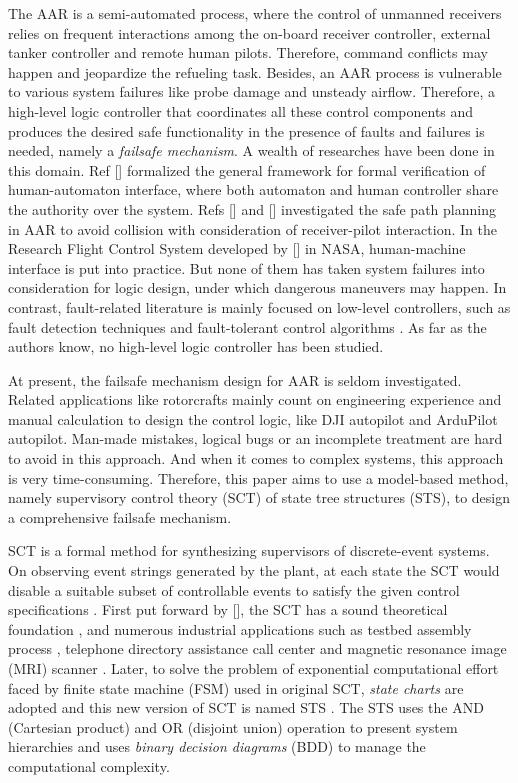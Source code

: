 The AAR is a semi-automated process, where the control of unmanned receivers relies on frequent interactions among the on-board receiver controller, external tanker controller and remote human pilots. Therefore, command conflicts may happen and jeopardize the refueling task.  Besides, an AAR process is vulnerable to various system failures like probe damage and unsteady airflow. Therefore, a high-level logic controller that coordinates all these control components and produces the desired safe functionality in the presence of faults and failures is needed, namely a \textit{failsafe mechanism}. A wealth of researches have been done in this domain. Ref [] formalized the general framework for formal verification of human-automaton interface, where both automaton and human controller share the authority over the system. Refs [] and [] investigated the safe path planning in AAR to avoid collision with consideration of receiver-pilot interaction. In the Research Flight Control System developed by  [] in NASA, human-machine interface is put into practice. But none of them has taken system failures into consideration for logic design, under which dangerous maneuvers may happen. In contrast, fault-related literature is  mainly focused on low-level controllers, such as fault detection techniques \cite{meskin2010hybrid} and fault-tolerant control algorithms \cite{zhang2006issues, falconi2016adaptive}. As far as the authors know, no high-level logic controller has been studied.

At present, the failsafe mechanism design for AAR is seldom investigated. Related applications like rotorcrafts mainly count on engineering experience and manual calculation to design the control logic, like DJI autopilot and ArduPilot autopilot. Man-made mistakes, logical bugs or an incomplete treatment are hard to avoid in this approach. And when it comes to complex systems, this approach is very time-consuming. Therefore, this paper aims to use a model-based method, namely supervisory control theory (SCT) of state tree structures (STS), to design a comprehensive failsafe mechanism.

SCT is a formal method for synthesizing supervisors of discrete-event systems. On observing event strings generated by the plant, at each state the SCT would disable a suitable subset of controllable events to satisfy the given control specifications \cite{WONHAM20171791}. First put forward by [], the SCT has a sound theoretical foundation \cite{cai2010supervisor, wonham2015supervisory}, and numerous industrial applications such as testbed assembly process \cite{brandin1994},  telephone directory assistance call center \cite{seidl2006} and magnetic resonance image (MRI) scanner \cite{theunissen2014}. Later, to solve the problem of exponential computational effort faced by finite state machine (FSM) used in original SCT, \textit{state charts} \cite{HAREL1987231} are adopted and this new version of SCT is named STS \cite{ma2006nonblocking}.  The STS uses the AND (Cartesian product) and OR (disjoint union) operation to present system hierarchies and uses \textit{binary decision diagrams} (BDD) \cite{Bryant86} to manage the computational complexity. 

